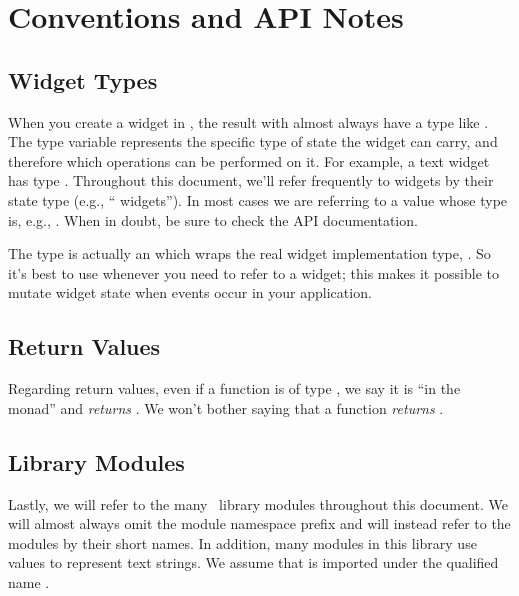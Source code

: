 \section{Conventions and API Notes}

\subsection{Widget Types}

When you create a widget in \vtyui, the result with almost always have
a type like .  The type variable  represents the
specific type of state the widget can carry, and therefore which
operations can be performed on it.  For example, a text widget has
type .  Throughout this document, we'll refer
frequently to widgets by their state type (e.g., ``
widgets''). In most cases we are referring to a value whose type is,
e.g., .  When in doubt, be sure to check the API
documentation.

The  type is actually an  which wraps the real
widget implementation type, .  So it's best to use
 whenever you need to refer to a widget; this makes it
possible to mutate widget state when events occur in your application.

\subsection{Return Values}

Regarding return values, even if a function is of type , we say it is ``in the  monad'' and \textit{returns}
.  We won't bother saying that a function \textit{returns }.

\subsection{Library Modules}

Lastly, we will refer to the many \vtyui\ library modules throughout
this document.  We will almost always omit the
 module namespace prefix and will instead
refer to the modules by their short names.  In addition, many modules
in this library use  values to represent text strings.
We assume that  is imported under the qualified name
.

